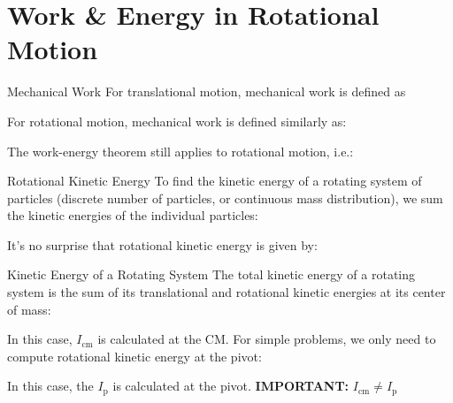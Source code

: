 \documentclass[12pt,compress,aspectratio=169]{beamer}
\begin{document}
\section{Work \& Energy in Rotational Motion}

\begin{frame}{Mechanical Work}
  For translational motion, mechanical work is defined as


  For rotational motion, mechanical work is defined similarly as:


  The work-energy theorem still applies to rotational motion, i.e.:

\end{frame}



\begin{frame}{Rotational Kinetic Energy}
  To find the kinetic energy of a rotating system of particles (discrete number
  of particles, or continuous mass distribution), we sum the
  kinetic energies of the individual particles:
    
  
  It's no surprise that rotational kinetic energy is given by:
  
\end{frame}



\begin{frame}{Kinetic Energy of a Rotating System}
  The total kinetic energy of a rotating system is the sum of its translational
  and rotational kinetic energies at its center of mass:

  
  In this case, $I_\text{cm}$ is calculated at the CM. For simple problems, we
  only need to compute rotational kinetic energy at the pivot:

  
  In this case, the $I_\text{p}$ is calculated at the pivot.
  \textbf{IMPORTANT:} $I_\text{cm}\neq I_\text{p}$
\end{frame}
\end{document}
